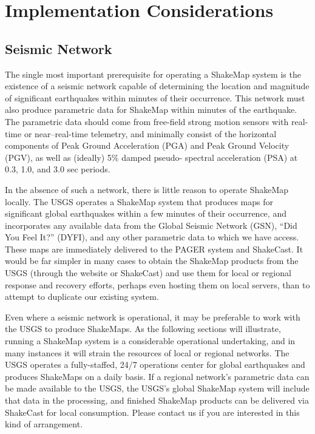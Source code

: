 \documentclass[letterpaper,10pt,english]{sphinxmanual}
\begin{document}
\section{Implementation Considerations}
\label{software_guide:implementation-considerations}

\subsection{Seismic Network}
\label{software_guide:seismic-network}
The single most important prerequisite for operating a ShakeMap system is the existence
of a seismic network capable of determining the location and magnitude of significant
earthquakes within minutes of their occurrence. This network must also produce
parametric data for ShakeMap within minutes of the earthquake. The parametric data
should come from free-field strong motion sensors with real-time or near--real-time
telemetry, and minimally consist of the horizontal components of Peak Ground
Acceleration (PGA) and Peak Ground Velocity (PGV), as well as (ideally) 5\% damped pseudo-
spectral acceleration (PSA) at 0.3, 1.0, and 3.0 sec periods.

In the absence of such a network, there is little reason to operate ShakeMap locally. The
USGS operates a ShakeMap system that produces maps for significant global
earthquakes within a few minutes of their occurrence, and incorporates any available data
from the Global Seismic Network (GSN), “Did You Feel It?” (DYFI), and any other parametric data to which
we have access. These maps are immediately delivered to the PAGER system and
ShakeCast. It would be far simpler in many cases to obtain the
ShakeMap products from the USGS (through the website or ShakeCast) and use them for
local or regional response and recovery efforts, perhaps even hosting them on local
servers, than to attempt to duplicate our existing system.

Even where a seismic network is operational, it may be preferable to work with the
USGS to produce ShakeMaps. As the following sections will illustrate, running a
ShakeMap system is a considerable operational undertaking, and in many instances it will
strain the resources of local or regional networks. The USGS operates a fully-staffed,
24/7 operations center for global earthquakes and produces ShakeMaps on a daily basis.
If a regional network's parametric data can be made available to the USGS, the USGS's
global ShakeMap system will include that data in the processing, and finished ShakeMap
products can be delivered via ShakeCast for local consumption. Please contact us if you
are interested in this kind of arrangement.
\end{document}
